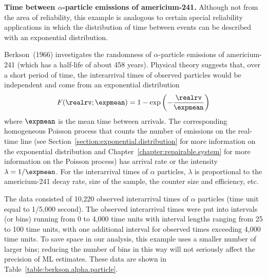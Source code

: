 \begin{example}
{\bf Time between $\alpha$-particle emissions of americium-241.}
\label{example:alpha.particle.data}
Although not from the area of reliability, this example is analogous
to certain special reliability applications in which the distribution
of time between events can be described with an exponential
distribution.

Berkson~(1966) investigates the randomness of $\alpha$-particle
emissions of americium-241 (which has a half-life of about 458 years).
Physical theory suggests that, over a short period of time, the
interarrival times of observed particles would be independent and
come from an exponential distribution
\begin {equation}
\label{equation:exponential.cdf}
F(\realrv;\expmean) = 1 - \exp 
\left( - \frac{\realrv}{\expmean} \right)
\end {equation}
where $\expmean$ is the mean time between arrivals. The corresponding 
homogeneous Poisson process that counts the number of emissions on the
real-time line (see Section~\ref{section:exponential.distribution} for
more information on the exponential distribution and
Chapter~\ref{chapter:repairable.system} for more information on the
Poisson process) has arrival rate or the intensity $\lambda=1/\expmean$. 
For the interarrival times of $\alpha$ particles,
$\lambda$ is proportional to the americium-241 decay rate, size of the 
sample, the counter size and efficiency, etc.

The data consisted of 10,220 observed interarrival
times of $\alpha$ particles (time unit equal to 1/5,000 second). The
observed interarrival times were put into intervals (or bins) running
from 0 to 4,000 time units with interval lengths ranging from 25 to
100 time units, with one additional interval for observed times exceeding
4,000 time units.  To save space in our analysis, this example uses a
smaller number of larger bins; reducing the number of bins in this way
will not seriously affect the precision of ML estimates.  These data
are shown in Table~\ref{table:berkson.alpha.particle}.


\end{example}
